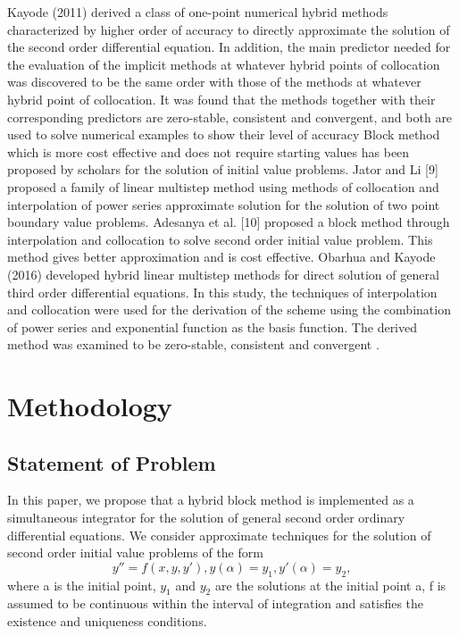 \documentclass[12pt]{report}
\begin{document}
\noindent Kayode (2011) derived a class of one-point numerical hybrid methods characterized by higher order of accuracy to directly approximate the solution of the second order differential equation. In addition, the main predictor needed for the evaluation of the implicit methods at whatever hybrid points of collocation was discovered to be the same order with those of the methods at whatever hybrid point of collocation. It was found that the methods together with their corresponding predictors are zero-stable, consistent and convergent, and both are used to solve numerical examples to show their level of accuracy %
\noindent Block method which is more cost effective and does not require starting values has been proposed by scholars for the solution of initial value problems. Jator and Li [9] proposed a family of linear multistep method using methods of collocation and interpolation of power series approximate solution for the solution of two point boundary value problems. Adesanya et al. [10] proposed a block method through interpolation and collocation to solve second order initial value problem. This method gives better approximation and is cost effective.
\noindent Obarhua and Kayode (2016) developed hybrid linear multistep methods for direct solution of general third order differential equations. In this study, the techniques of interpolation and collocation were used for the derivation of the scheme using the combination of power series and exponential function as the basis function. The derived method was examined to be zero-stable, consistent and convergent \cite{obarhua}.


\chapter{Methodology}
\section{Statement of Problem}
In this paper, we propose that a hybrid block method is implemented as a simultaneous integrator for the solution of general second order ordinary differential equations. We consider approximate techniques for the solution of second order initial value problems of the form
	\begin{equation}
		y'' = f (x, y, y'), y(\alpha) = y_1 , y'(\alpha) = y_2 ,						 		
	\end{equation}
	where a is the initial point, $y_1$ and $y_2$ are the solutions at the initial point a, f is assumed to be continuous within the interval of integration and satisfies the existence and uniqueness conditions.
\end{document}
